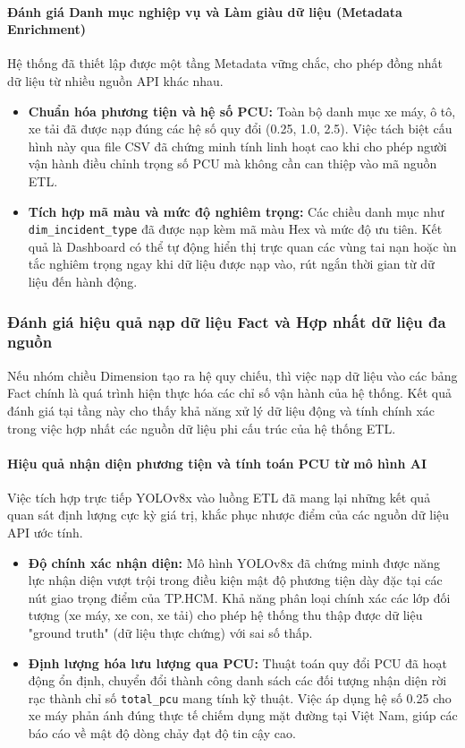 \paragraph{Đánh giá Danh mục nghiệp vụ và Làm giàu dữ liệu (Metadata Enrichment)}
Hệ thống đã thiết lập được một tầng Metadata vững chắc, cho phép đồng nhất dữ liệu từ nhiều nguồn API khác nhau.
\begin{itemize}
    \item \textbf{Chuẩn hóa phương tiện và hệ số PCU:} Toàn bộ danh mục xe máy, ô tô, xe tải đã được nạp đúng các hệ số quy đổi (0.25, 1.0, 2.5). Việc tách biệt cấu hình này qua file CSV đã chứng minh tính linh hoạt cao khi cho phép người vận hành điều chỉnh trọng số PCU mà không cần can thiệp vào mã nguồn ETL.
    \item \textbf{Tích hợp mã màu và mức độ nghiêm trọng:} Các chiều danh mục như \texttt{dim\_incident\_type} đã được nạp kèm mã màu Hex và mức độ ưu tiên. Kết quả là Dashboard có thể tự động hiển thị trực quan các vùng tai nạn hoặc ùn tắc nghiêm trọng ngay khi dữ liệu được nạp vào, rút ngắn thời gian từ dữ liệu đến hành động.
\end{itemize}
\subsubsection{Đánh giá hiệu quả nạp dữ liệu Fact và Hợp nhất dữ liệu đa nguồn}

Nếu nhóm chiều Dimension tạo ra hệ quy chiếu, thì việc nạp dữ liệu vào các bảng Fact chính là quá trình hiện thực hóa các chỉ số vận hành của hệ thống. Kết quả đánh giá tại tầng này cho thấy khả năng xử lý dữ liệu động và tính chính xác trong việc hợp nhất các nguồn dữ liệu phi cấu trúc của hệ thống ETL.

\paragraph{Hiệu quả nhận diện phương tiện và tính toán PCU từ mô hình AI}
Việc tích hợp trực tiếp YOLOv8x vào luồng ETL đã mang lại những kết quả quan sát định lượng cực kỳ giá trị, khắc phục nhược điểm của các nguồn dữ liệu API ước tính.
\begin{itemize}
    \item \textbf{Độ chính xác nhận diện:} Mô hình YOLOv8x đã chứng minh được năng lực nhận diện vượt trội trong điều kiện mật độ phương tiện dày đặc tại các nút giao trọng điểm của TP.HCM. Khả năng phân loại chính xác các lớp đối tượng (xe máy, xe con, xe tải) cho phép hệ thống thu thập được dữ liệu "ground truth" (dữ liệu thực chứng) với sai số thấp.
    \item \textbf{Định lượng hóa lưu lượng qua PCU:} Thuật toán quy đổi PCU đã hoạt động ổn định, chuyển đổi thành công danh sách các đối tượng nhận diện rời rạc thành chỉ số \texttt{total\_pcu} mang tính kỹ thuật. Việc áp dụng hệ số 0.25 cho xe máy phản ánh đúng thực tế chiếm dụng mặt đường tại Việt Nam, giúp các báo cáo về mật độ dòng chảy đạt độ tin cậy cao.
\end{itemize}

